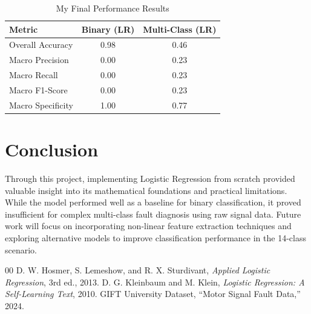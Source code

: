 \documentclass[conference]{IEEEtran}
\begin{document}
\begin{table}[H]
\caption{My Final Performance Results}
\centering
\begin{tabular}{@{}lcc@{}}
\toprule
\textbf{Metric} & \textbf{Binary (LR)} & \textbf{Multi-Class (LR)} \\ \midrule
Overall Accuracy & 0.98                 & 0.46                        \\
Macro Precision  & 0.00                 & 0.23                        \\
Macro Recall     & 0.00                 & 0.23                        \\
Macro F1-Score   & 0.00                 & 0.23                        \\
Macro Specificity& 1.00                 & 0.77                        \\ \bottomrule
\end{tabular}
\end{table}

\section{Conclusion}
Through this project, implementing Logistic Regression from scratch provided valuable insight into its mathematical foundations and practical limitations. While the model performed well as a baseline for binary classification, it proved insufficient for complex multi-class fault diagnosis using raw signal data. Future work will focus on incorporating non-linear feature extraction techniques and exploring alternative models to improve classification performance in the 14-class scenario.

\begin{thebibliography}{00}
 D. W. Hosmer, S. Lemeshow, and R. X. Sturdivant, \textit{Applied Logistic Regression}, 3rd ed., 2013.
 D. G. Kleinbaum and M. Klein, \textit{Logistic Regression: A Self-Learning Text}, 2010.
 GIFT University Dataset, ``Motor Signal Fault Data,'' 2024.
\end{thebibliography}
\end{document}
